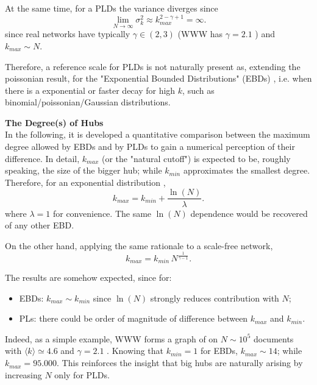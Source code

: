 \documentclass[a4paper,10pt,twoside]{book} %
\theoremstyle{definition}
\begin{document}
At the same time, for a PLDs the variance diverges since \cite{barabasi::2016networkbook}	
\begin{equation}
	\lim_{N \to \infty} \sigma_k^2 \approx k_{max}^{2-\gamma+1} = \infty.
	\label{eq:sigma_SFnets}
\end{equation}
since real networks have typically $\gamma \in (2,3)$ (WWW has $\gamma =  2.1$ \cite{barabasi::2016networkbook}) and $k_{max} \sim N$. 

Therefore, a reference scale for PLDs is not naturally present as, extending the poissonian result, for the "Exponential Bounded Distributions" (EBDs) \cite{barabasi::2016networkbook}, i.e. when there is a exponential or faster decay for high $k$, such as binomial/poissonian/Gaussian distributions.

{\large \textbf{The Degree(s) of Hubs}} \\
In the following, it is developed a quantitative comparison between the maximum degree allowed by EBDs and by PLDs to gain a numerical perception of their difference.
In detail, $k_{max}$ (or the "natural cutoff") is expected to be, roughly speaking, the size of the bigger hub; while $k_{min}$ approximates the smallest degree.
Therefore, for an exponential distribution \cite{barabasi::2016networkbook}, 
\begin{equation}
	k_{max} = k_{min} + \frac{\ln(N)}{\lambda}.
	\label{eq:Expkmax_up}	
\end{equation}
where $\lambda = 1$ for convenience. The same $\ln(N)$ dependence would be recovered of any other EBD.

On the other hand, applying the same rationale to a scale-free network, 
\begin{equation}
	k_{max} = k_{min}\,N^{\frac{1}{\gamma-1}}.
	\label{eq:SFkmax_up}
\end{equation}

The results are somehow expected, since for:
\begin{itemize}
	\item EBDs: $k_{max} \sim k_{min}$ since $\ln(N)$ strongly reduces contribution with $N$;
	\item PLs: there could be order of magnitude of difference between $k_{max}$ and $k_{min}$.
\end{itemize} 
Indeed, as a simple example, WWW forms a graph of on $N \sim 10^5$ documents with $\langle k \rangle \simeq 4.6$ and $\gamma = 2.1$ \cite{barabasi::2016networkbook}. 
Knowing that $k_{min} = 1$ for EBDs, $k_{max} \sim 14$; while $k_{max} = 95.000$. 
This reinforces the insight that big hubs are naturally arising by increasing $N$ only for PLDs.
\label{sec:SFProperties_up}
\end{document}
